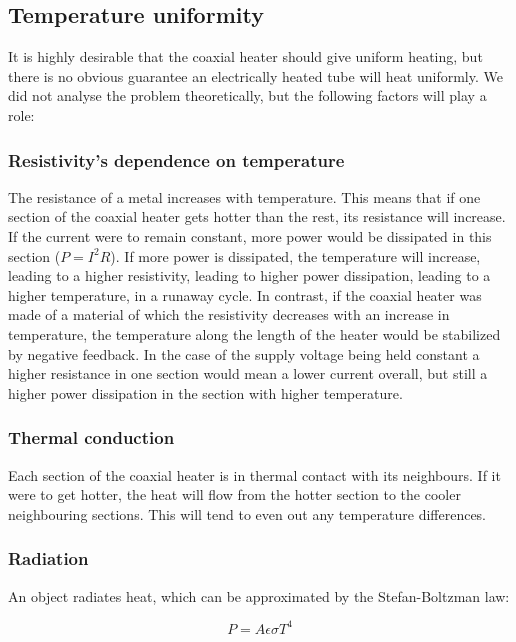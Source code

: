 \subsection{Temperature uniformity}
\label{sec:Uniformity}

It is highly desirable that the coaxial heater should give uniform heating, but
there is no obvious guarantee an electrically heated tube will heat uniformly.
We did not analyse the problem theoretically, but the following factors will
play a role:

\subsubsection{Resistivity's dependence on temperature}

The resistance of a metal increases with temperature. This means that if one
section of the coaxial heater gets hotter than the rest, its resistance
will increase. If the current were to remain constant, more power would be
dissipated in this section (\(P=I^2R\)). If more power is dissipated, the
temperature will increase, leading to a higher resistivity, leading to higher
power dissipation, leading to a higher temperature, in a runaway cycle. In
contrast, if the coaxial heater was made of a material of which the resistivity
decreases with an increase in temperature, the temperature along the length of
the heater would be stabilized by negative feedback. In the case of the supply
voltage being held constant a higher resistance in one section would mean a
lower current overall, but still a higher power dissipation in the section with
higher temperature.

\subsubsection{Thermal conduction}

Each section of the coaxial heater is in thermal contact with its neighbours. If
it were to get hotter, the heat will flow from the hotter section to the cooler
neighbouring sections. This will tend to even out any temperature differences.

\subsubsection{Radiation}

An object radiates heat, which can be approximated by the Stefan-Boltzman law:

\begin{equation}\label{eq:1}
	P=A \epsilon \sigma T^4
\end{equation}

